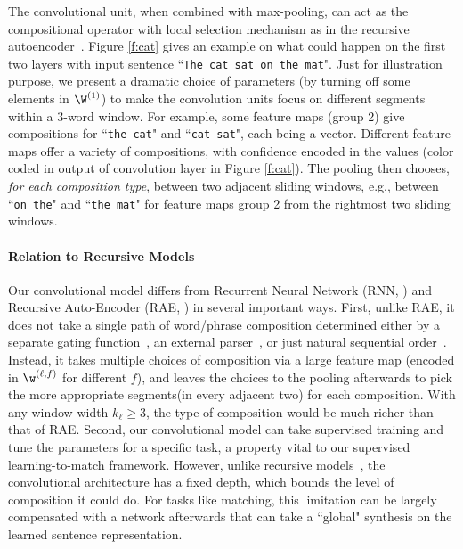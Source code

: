 \documentclass{article} %
\begin{document}
The convolutional unit, when combined with max-pooling, can act as the compositional operator with local selection mechanism as in the recursive autoencoder~\cite{RAE}. Figure \ref{f:cat} gives an example on what could happen on the first two layers with input sentence ``\texttt{\small The cat sat on the mat}". Just for illustration purpose, we present a dramatic choice of parameters (by turning off some elements in $\W^{(1)}$) to make the convolution units focus on different segments within a 3-word window. For example, some feature maps (group 2) give compositions for ``\texttt{\small the cat}" and ``\texttt{\small cat sat}", each being a vector. Different feature maps offer a variety of compositions, with confidence encoded in the values (color coded in output of convolution layer in Figure \ref{f:cat}). The pooling then chooses, \emph{for each composition type}, between two adjacent sliding windows, e.g., between ``\texttt{\small on the}" and ``\texttt{\small the mat}" for feature maps group 2 from the rightmost two sliding windows.

\paragraph{Relation to Recursive Models} Our convolutional model differs from Recurrent Neural Network (RNN, \cite{RNN}) and Recursive Auto-Encoder (RAE, \cite{RAE}) in several important ways. First, unlike RAE, it does not take a single path of word/phrase composition determined either by a separate gating function~\cite{RAE}, an external parser~\cite{socher2011}, or just natural sequential order~\cite{socherRNN}. Instead, it takes multiple choices of composition via a large feature map (encoded in $\w^{(\ell,f)}$ for different $f$), and leaves the choices to the pooling afterwards to pick the more appropriate segments(in every adjacent two) for each composition. With any window width $k_{\ell}\geq 3$, the type of composition would be much richer than that of RAE. Second, our convolutional model can take supervised training and tune the parameters for a specific task, a property vital to our supervised learning-to-match framework. However, unlike recursive models~\cite{socherRNN, RAE}, the convolutional architecture has a fixed depth, which bounds the level of composition it could do. For tasks like matching, this limitation can be largely compensated with a network afterwards that can take a ``global" synthesis on the learned sentence representation.
\end{document}

